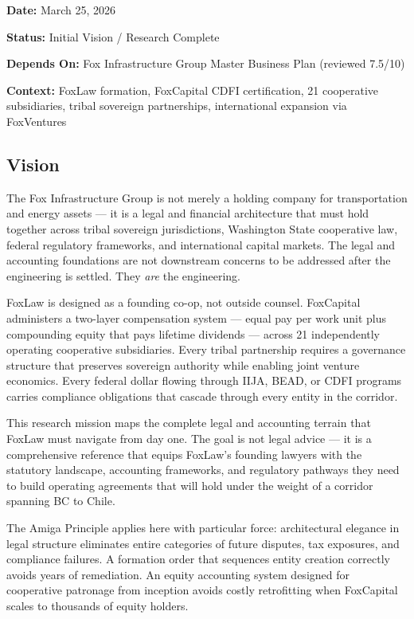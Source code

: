 \documentclass[11pt,letterpaper]{article}
\newcommand{\metafield}[2]{\textbf{\sffamily #1} #2\par}
\begin{document}
\metafield{Date:}{March 25, 2026}
\metafield{Status:}{Initial Vision / Research Complete}
\metafield{Depends On:}{Fox Infrastructure Group Master Business Plan (reviewed 7.5/10)}
\metafield{Context:}{FoxLaw formation, FoxCapital CDFI certification, 21 cooperative subsidiaries, tribal sovereign partnerships, international expansion via FoxVentures}

\subsection{Vision}

The Fox Infrastructure Group is not merely a holding company for transportation and energy assets --- it is a legal and financial architecture that must hold together across tribal sovereign jurisdictions, Washington State cooperative law, federal regulatory frameworks, and international capital markets. The legal and accounting foundations are not downstream concerns to be addressed after the engineering is settled. They \textit{are} the engineering.

FoxLaw is designed as a founding co-op, not outside counsel. FoxCapital administers a two-layer compensation system --- equal pay per work unit plus compounding equity that pays lifetime dividends --- across 21 independently operating cooperative subsidiaries. Every tribal partnership requires a governance structure that preserves sovereign authority while enabling joint venture economics. Every federal dollar flowing through IIJA, BEAD, or CDFI programs carries compliance obligations that cascade through every entity in the corridor.

This research mission maps the complete legal and accounting terrain that FoxLaw must navigate from day one. The goal is not legal advice --- it is a comprehensive reference that equips FoxLaw's founding lawyers with the statutory landscape, accounting frameworks, and regulatory pathways they need to build operating agreements that will hold under the weight of a corridor spanning BC to Chile.

The Amiga Principle applies here with particular force: architectural elegance in legal structure eliminates entire categories of future disputes, tax exposures, and compliance failures. A formation order that sequences entity creation correctly avoids years of remediation. An equity accounting system designed for cooperative patronage from inception avoids costly retrofitting when FoxCapital scales to thousands of equity holders.
\end{document}
